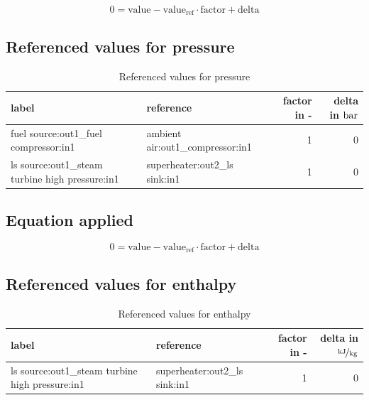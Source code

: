 \begin{equation}
\label{eq:Connection_ref}
0 = \text{value} - \text{value}_\mathrm{ref} \cdot \mathrm{factor} + \text{delta}
\end{equation}

\subsection{Referenced values for pressure}

\begin{table}[H]\begin{center}
\begin{tabular}{llrr}
\toprule
                                           label &                         reference &  factor in - &  delta in $\unit[]{bar}$ \\
\midrule
           fuel source:out1\_fuel compressor:in1 &  ambient air:out1\_compressor:in1 &            1 &                        0 \\
 ls source:out1\_steam turbine high pressure:in1 &     superheater:out2\_ls sink:in1 &            1 &                        0 \\
\bottomrule
\end{tabular}
\caption{Referenced values for pressure}
\end{center}\end{table}

\subsection{Equation applied}

\begin{equation}
\label{eq:Connection_ref}
0 = \text{value} - \text{value}_\mathrm{ref} \cdot \mathrm{factor} + \text{delta}
\end{equation}

\subsection{Referenced values for enthalpy}

\begin{table}[H]\begin{center}
\begin{tabular}{llrr}
\toprule
                                           label &                      reference &  factor in - &  delta in $\unitfrac[]{kJ}{kg}$ \\
\midrule
 ls source:out1\_steam turbine high pressure:in1 &  superheater:out2\_ls sink:in1 &            1 &                               0 \\
\bottomrule
\end{tabular}
\caption{Referenced values for enthalpy}
\end{center}\end{table}


